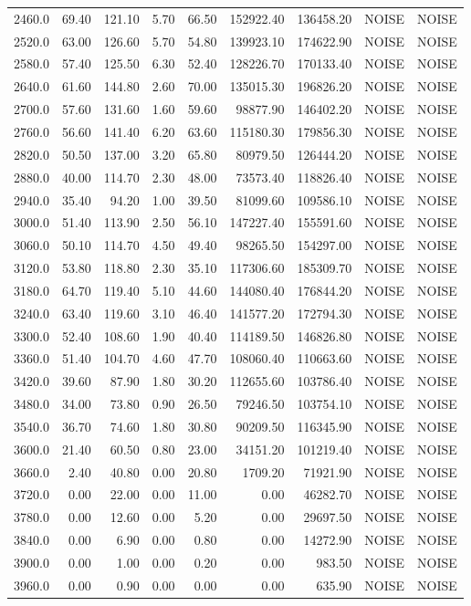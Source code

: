\begin{tabular}{r|rr|rr|rr|rr}
2460.0 & 69.40 & 121.10 & 5.70 & 66.50 & 152922.40 & 136458.20 & NOISE & NOISE \\
2520.0 & 63.00 & 126.60 & 5.70 & 54.80 & 139923.10 & 174622.90 & NOISE & NOISE \\
2580.0 & 57.40 & 125.50 & 6.30 & 52.40 & 128226.70 & 170133.40 & NOISE & NOISE \\
2640.0 & 61.60 & 144.80 & 2.60 & 70.00 & 135015.30 & 196826.20 & NOISE & NOISE \\
2700.0 & 57.60 & 131.60 & 1.60 & 59.60 & 98877.90 & 146402.20 & NOISE & NOISE \\
2760.0 & 56.60 & 141.40 & 6.20 & 63.60 & 115180.30 & 179856.30 & NOISE & NOISE \\
2820.0 & 50.50 & 137.00 & 3.20 & 65.80 & 80979.50 & 126444.20 & NOISE & NOISE \\
2880.0 & 40.00 & 114.70 & 2.30 & 48.00 & 73573.40 & 118826.40 & NOISE & NOISE \\
2940.0 & 35.40 & 94.20 & 1.00 & 39.50 & 81099.60 & 109586.10 & NOISE & NOISE \\
3000.0 & 51.40 & 113.90 & 2.50 & 56.10 & 147227.40 & 155591.60 & NOISE & NOISE \\
3060.0 & 50.10 & 114.70 & 4.50 & 49.40 & 98265.50 & 154297.00 & NOISE & NOISE \\
3120.0 & 53.80 & 118.80 & 2.30 & 35.10 & 117306.60 & 185309.70 & NOISE & NOISE \\
3180.0 & 64.70 & 119.40 & 5.10 & 44.60 & 144080.40 & 176844.20 & NOISE & NOISE \\
3240.0 & 63.40 & 119.60 & 3.10 & 46.40 & 141577.20 & 172794.30 & NOISE & NOISE \\
3300.0 & 52.40 & 108.60 & 1.90 & 40.40 & 114189.50 & 146826.80 & NOISE & NOISE \\
3360.0 & 51.40 & 104.70 & 4.60 & 47.70 & 108060.40 & 110663.60 & NOISE & NOISE \\
3420.0 & 39.60 & 87.90 & 1.80 & 30.20 & 112655.60 & 103786.40 & NOISE & NOISE \\
3480.0 & 34.00 & 73.80 & 0.90 & 26.50 & 79246.50 & 103754.10 & NOISE & NOISE \\
3540.0 & 36.70 & 74.60 & 1.80 & 30.80 & 90209.50 & 116345.90 & NOISE & NOISE \\
3600.0 & 21.40 & 60.50 & 0.80 & 23.00 & 34151.20 & 101219.40 & NOISE & NOISE \\
3660.0 & 2.40 & 40.80 & 0.00 & 20.80 & 1709.20 & 71921.90 & NOISE & NOISE \\
3720.0 & 0.00 & 22.00 & 0.00 & 11.00 & 0.00 & 46282.70 & NOISE & NOISE \\
3780.0 & 0.00 & 12.60 & 0.00 & 5.20 & 0.00 & 29697.50 & NOISE & NOISE \\
3840.0 & 0.00 & 6.90 & 0.00 & 0.80 & 0.00 & 14272.90 & NOISE & NOISE \\
3900.0 & 0.00 & 1.00 & 0.00 & 0.20 & 0.00 & 983.50 & NOISE & NOISE \\
3960.0 & 0.00 & 0.90 & 0.00 & 0.00 & 0.00 & 635.90 & NOISE & NOISE \\
\bottomrule
\end{tabular}
